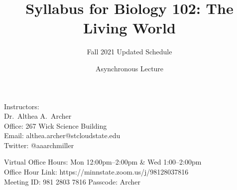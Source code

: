 \documentclass{tufte-handout}
\title{Syllabus for Biology 102: The Living World}										%
\author{Fall 2021 \color{red} Updated Schedule \color{black} }								%
\date{Asynchronous Lecture}
\begin{document}
\maketitle

Instructors:  \\
Dr.~Althea A.~Archer\\
Office: 267 Wick Science Building\\
Email: althea.archer@stcloudstate.edu\\
Twitter: @aaarchmiller

\color{gray} Virtual Office Hours: Mon 12:00pm--2:00pm \& Wed 1:00--2:00pm\\
Office Hour Link: https://minnstate.zoom.us/j/98128037816\\
Meeting ID: 981 2803 7816 Passcode: Archer \color{black}
\end{document}
